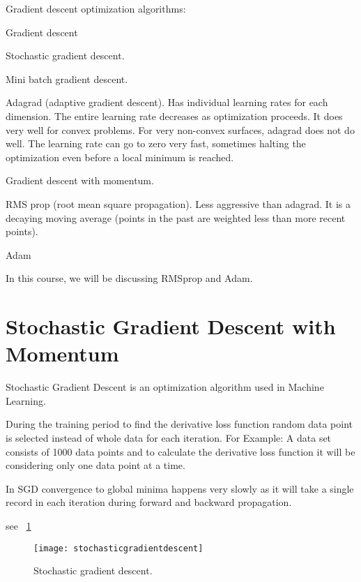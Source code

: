 Gradient descent optimization algorithms:
	\begin{bulletedlist}
		\item Gradient descent
		\item Stochastic gradient descent.
		\item Mini batch gradient descent.
		\item Adagrad (adaptive gradient descent).  Has individual learning rates for each dimension.  The entire learning rate decreases as optimization proceeds.  It does very well for convex problems.  For very non-convex surfaces, adagrad does not do well.  The learning rate can go to zero very fast, sometimes halting the optimization even before a local minimum is reached.
		\item Gradient descent with momentum.
		\item RMS prop (root mean square propagation).  Less aggressive than adagrad.  It is a decaying moving average (points in the past are weighted less than more recent points).
		\item Adam
	\end{bulletedlist}

In this course, we will be discussing RMSprop and Adam.

	\section{Stochastic Gradient Descent with Momentum}

	\begin{bulletedlist}
		\item Stochastic Gradient Descent is an optimization algorithm used in Machine Learning.
		\item During the training period to find the derivative loss function random data point is selected instead of whole data for each iteration.  For Example: A data set consists of 1000 data points and to calculate the derivative loss function it will be considering only one data point at a time.
		\item In SGD convergence to global minima happens very slowly as it will take a single record in each iteration during forward and backward propagation.
	\end{bulletedlist}
see \figurename~\ref{fig:stochasticgradientdescent}
 	\begin{figure}[htb]
		\centering
		\texttt{[image: stochasticgradientdescent]}
		\caption[Stochastic gradient descent]{Stochastic gradient descent.}
		\label{fig:stochasticgradientdescent}
	\end{figure}


